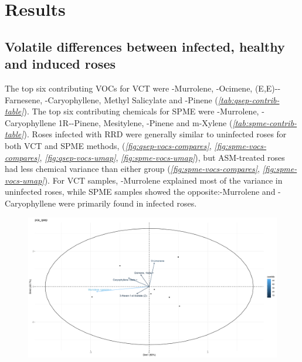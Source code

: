 \documentclass[12pt,final,CPage]{ufthesis}
\begin{document}
{  \hypertarget{results-vocs-olfact}{%
  \section{Results}\label{results-vocs-olfact}}

  \hypertarget{results-vocs}{%
  \subsection{Volatile differences between infected, healthy and induced roses}\label{results-vocs}}

  The top six contributing VOCs for VCT were \textgamma-Murrolene, \textbeta-Ocimene, (E,E)-\textalpha-Farnesene, \textbeta-Caryophyllene, Methyl Salicylate and \textbeta-Pinene (\emph{\ref{tab:qsep-contrib-table}}). The top six contributing chemicals for SPME were \textgamma-Murrolene, \textbeta-Caryophyllene 1R-\textalpha-Pinene, Mesitylene, \textbeta-Pinene and m-Xylene (\emph{\ref{tab:spme-contrib-table}}). Roses infected with RRD were generally similar to uninfected roses for both VCT and SPME methods, (\emph{\ref{fig:qsep-vocs-compares}}, \emph{\ref{fig:spme-vocs-compares}}, \emph{\ref{fig:qsep-vocs-umap}}, \emph{\ref{fig:spme-vocs-umap}}), but ASM-treated roses had less chemical variance than either group (\emph{\ref{fig:spme-vocs-compares}}, \emph{\ref{fig:spme-vocs-umap}}). For VCT samples, \textgamma-Murrolene explained most of the variance in uninfected roses, while SPME samples showed the opposite:\textgamma-Murrolene and \textbeta-Caryophyllene were primarily found in infected roses.
  \begin{figure}

  {\centering \includegraphics[width=1\linewidth]{figure/rrv_volatiles_biplot_var_pca_qsep} 

  }


\end{figure}}
\end{document}
